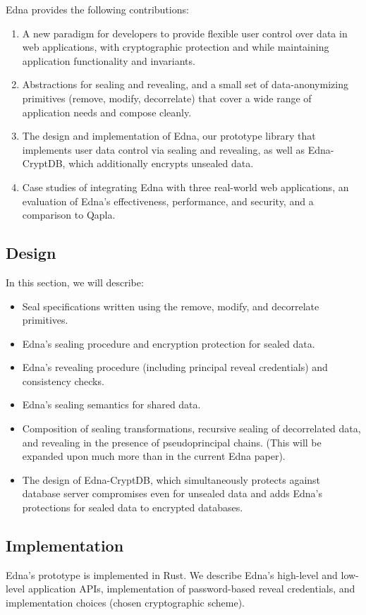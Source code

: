 \label{sec:intro:contrib}
Edna provides the following contributions:
\begin{enumerate}[nosep] 
    \item A new paradigm for developers to provide flexible user control over data in web applications, with cryptographic protection and while maintaining application functionality and invariants.
    \item Abstractions for sealing and revealing, and a small set of data-anonymizing primitives (remove, modify, decorrelate) that cover a wide range of application needs and compose cleanly.
    \item The design and implementation of Edna, our prototype library that implements user data control via sealing and revealing, as well as Edna-CryptDB, which additionally encrypts unsealed data.
    \item Case studies of integrating Edna with three real-world web applications, an evaluation of Edna's effectiveness, performance, and security, and a comparison to Qapla.
\end{enumerate}

\subsection{Design}
In this section, we will describe:
\begin{itemize}[nosep]
    \item Seal specifications written using the remove, modify, and decorrelate primitives.
    \item Edna's sealing procedure and encryption protection for sealed data.
    \item Edna's revealing procedure (including principal reveal credentials) and consistency checks.
    \item Edna's sealing semantics for shared data.
    \item Composition of sealing transformations, recursive sealing of
        decorrelated data, and revealing in the presence of pseudoprincipal
        chains. (This will be expanded upon much more than in the current Edna
        paper).
    \item The design of Edna-CryptDB, which simultaneously protects against database server compromises even for
unsealed data and adds Edna's protections for sealed data to encrypted
        databases.
\end{itemize}

\subsection{Implementation}
Edna's prototype is implemented in Rust. We describe Edna's high-level and low-level
application APIs, implementation of password-based reveal credentials, and
implementation choices (\eg chosen cryptographic scheme).

